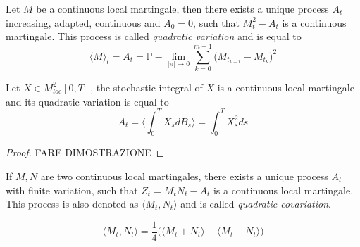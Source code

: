 \begin{proposition}
    Let $M$ be a continuous local martingale, then there exists a unique process $A_t$ increasing, adapted, continuous and $A_0 = 0$, such that $M_t^2 - A_t$ is a continuous martingale. This process is called \textit{quadratic variation} and is equal to 
    \begin{equation}
        \langle M \rangle_t = A_t = \mathbb{P}-\lim_{\vert \pi \vert \to 0} \sum_{k = 0}^{m-1} \big( M_{t_{k+1}} - M_{t_k} \big)^2 
    \end{equation}
\end{proposition}

\begin{proposition}
    Let $X \in M^2_{loc}[0,T]$, the stochastic integral of $X$ is a continuous local martingale and its quadratic variation is equal to 
    \begin{equation}
        A_t = \Big\langle \int_0^T X_s dB_s \Big\rangle = \int_0^T X_s^2 ds  
    \end{equation}
\end{proposition}
\begin{proof}
    FARE DIMOSTRAZIONE
\end{proof}

\begin{corollary}
    If $M,N$ are two continuous local martingales, there exists a unique process $A_t$ with finite variation, such that $Z_t = M_t N_t - A_t$ is a continuous local martingale. This process is also denoted as $\langle M_t, N_t \rangle$ and is called \textit{quadratic covariation}. 

    \begin{equation}
        \langle M_t, N_t \rangle = \frac{1}{4}\Big( \langle M_t + N_t \rangle - \langle M_t - N_t \rangle \Big)
    \end{equation}
\end{corollary}

